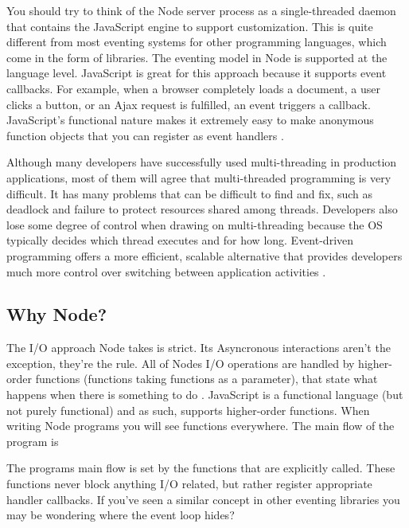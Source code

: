 \documentclass[12pt]{article} %
\begin{document}
You should try to think of the Node server process as a single-threaded daemon that contains the JavaScript engine to support customization. This is quite different from most eventing systems for other programming languages, which come in the form of libraries. The eventing model in Node is supported at the language level. JavaScript is great for this approach because it supports event callbacks.
For example, when a browser completely loads a document, a user clicks a button, or an Ajax request is fulfilled, an event triggers a callback. JavaScript's functional nature makes it extremely easy to make anonymous function objects that you can register as event handlers \cite{4}.

Although many developers have successfully used multi-threading in production applications, most of them will agree that multi-threaded programming is very difficult. It has many problems that can be difficult to find and fix, such as deadlock and failure to protect resources shared among threads. Developers also lose some degree of control when drawing on multi-threading because the OS typically decides which thread executes and for how long. Event-driven programming offers a more efficient, scalable alternative that provides developers much more control over switching between application activities \cite{4}.

\subsection{Why Node?}
The I/O approach Node takes is strict. Its Asyncronous interactions aren't the exception, they're the rule. All of Nodes I/O operations are handled by higher-order functions (functions taking functions as a parameter), that state what happens when there is something to do \cite{4}.
JavaScript is a functional language (but not purely functional) and as such, supports higher-order functions. When writing Node programs you will see functions everywhere. The main flow of the program is 

The programs main flow is set by the functions that are explicitly called. These functions never block anything I/O related, but rather register appropriate handler callbacks. If you've seen a similar concept in other eventing libraries you may be wondering where the event loop hides?
\end{document}
